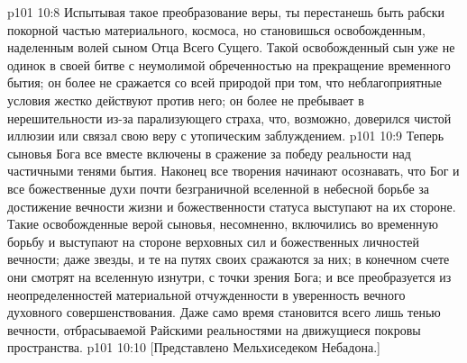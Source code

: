 \vs p101 10:8 Испытывая такое преобразование веры, ты перестанешь быть рабски покорной частью материального, космоса, но становишься освобожденным, наделенным волей сыном Отца Всего Сущего. Такой освобожденный сын уже не одинок в своей битве с неумолимой обреченностью на прекращение временного бытия; он более не сражается со всей природой при том, что неблагоприятные условия жестко действуют против него; он более не пребывает в нерешительности из\hyp{}за парализующего страха, что, возможно, доверился чистой иллюзии или связал свою веру с утопическим заблуждением.
\vs p101 10:9 Теперь сыновья Бога все вместе включены в сражение за победу реальности над частичными тенями бытия. Наконец все творения начинают осознавать, что Бог и все божественные духи почти безграничной вселенной в небесной борьбе за достижение вечности жизни и божественности статуса выступают на их стороне. Такие освобожденные верой сыновья, несомненно, включились во временную борьбу и выступают на стороне верховных сил и божественных личностей вечности; даже звезды, и те на путях своих сражаются за них; в конечном счете они смотрят на вселенную изнутри, с точки зрения Бога; и все преобразуется из неопределенностей материальной отчужденности в уверенность вечного духовного совершенствования. Даже само время становится всего лишь тенью вечности, отбрасываемой Райскими реальностями на движущиеся покровы пространства.
\vs p101 10:10 [Представлено Мельхиседеком Небадона.]
